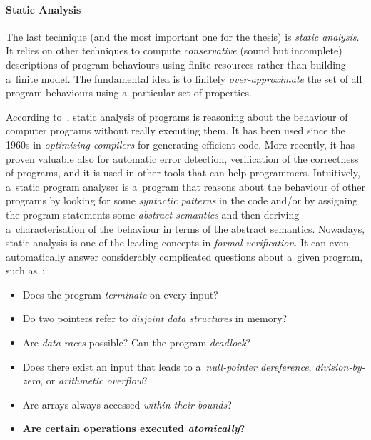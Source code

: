 \paragraph{Static Analysis}
The last technique (and the most important one for the thesis) is \emph{static analysis}. It relies on other techniques to compute \emph{conservative} (sound but incomplete) descriptions of program behaviours using finite resources rather than building a~finite model. The fundamental idea is to finitely \emph{over-approximate} the set of all program behaviours using a~particular set of properties.

According to~\cite{staticAnalysisMoller}, static analysis of programs is reasoning about the behaviour of computer programs without really executing them. It has been used since the 1960s in \emph{optimising compilers} for generating efficient code. More recently, it has proven valuable also for automatic error detection, verification of the correctness of programs, and it is used in other tools that can help programmers. Intuitively, a~static program analyser is a~program that reasons about the behaviour of other programs by looking for some \emph{syntactic patterns} in the code and/or by assigning the program statements some \emph{abstract semantics} and then deriving a~characterisation of the behaviour in terms of the abstract semantics. Nowadays, static analysis is one of the leading concepts in \emph{formal verification}. It can even automatically answer considerably complicated questions about a~given program, such as~\cite{staticAnalysisMoller}:
\begin{itemize}
    \item Does the program \emph{terminate} on every input?

    \item Do two pointers refer to \emph{disjoint data structures} in memory?

    \item Are \emph{data races} possible? Can the program \emph{deadlock}?

    \item Does there exist an input that leads to a~\emph{null-pointer dereference}, \emph{division-by-zero}, or \emph{arithmetic overflow}?

    \item Are arrays always accessed \emph{within their bounds}?

    \item \textbf{Are certain operations executed \emph{atomically}?}
\end{itemize}

